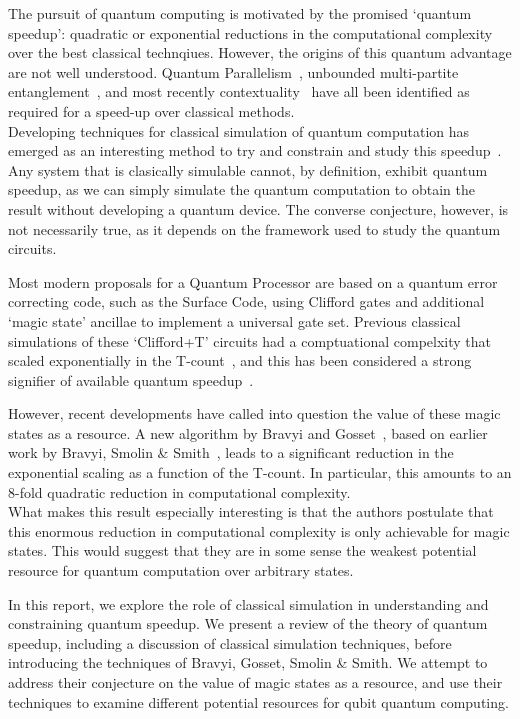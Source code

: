 \documentclass{standalone}
\begin{document}
The pursuit of quantum computing is motivated by the promised `quantum speedup': quadratic or exponential reductions in the computational complexity over the best classical technqiues. However, the origins of this quantum advantage are not well understood. Quantum Parallelism~\cite{Deutsch1985}, unbounded multi-partite entanglement~\cite{Jozsa2003}, and most recently contextuality~\cite{Howard2014} have all been identified as required for a speed-up over classical methods. \\
Developing techniques for classical simulation of quantum computation has emerged as an interesting method to try and constrain and study this speedup~\cite{Jozsa2003}. Any system that is clasically simulable cannot, by definition, exhibit quantum speedup, as we can simply simulate the quantum computation to obtain the result without developing a quantum device. The converse conjecture, however, is not necessarily true, as it depends on the framework used to study the quantum circuits.  
\par
Most modern proposals for a Quantum Processor are based on a quantum error correcting code, such as the Surface Code, using Clifford gates and additional `magic state' ancillae to implement a universal gate set. Previous classical simulations of these `Clifford+T' circuits had a comptuational compelxity that scaled exponentially in the T-count~\cite{Aaronson2004a}, and this has been considered a strong signifier of available quantum speedup~\cite{Jozsa2003}.
\par
However, recent developments have called into question the value of these magic states as a resource. A new algorithm by Bravyi and Gosset~\cite{Bravyi2016b}, based on earlier work by Bravyi, Smolin \& Smith~\cite{Bravyi2015}, leads to a significant reduction in the exponential scaling as a function of the T-count. In particular, this amounts to an 8-fold quadratic reduction in computational complexity. \\
What makes this result especially interesting is that the authors postulate that this enormous reduction in computational complexity is only achievable for magic states.  This would suggest that they are in some sense the weakest potential resource for quantum computation over arbitrary states. 
\par
In this report, we explore the role of classical simulation in understanding and constraining quantum speedup. We present a review of the theory of quantum speedup, including a discussion of classical simulation techniques, before introducing the techniques of Bravyi, Gosset, Smolin \& Smith. We attempt to address their conjecture on the value of magic states as a resource, and use their techniques to examine different potential resources for qubit quantum computing. 
\ifstandalone

\fi
\end{document}
